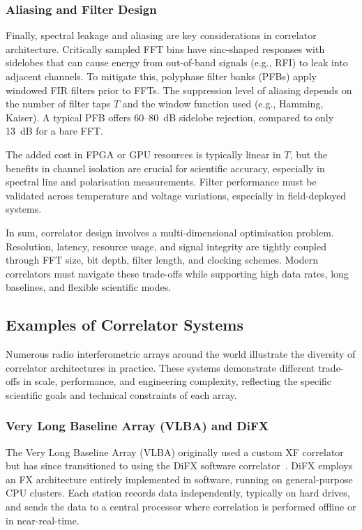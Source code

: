         \subsubsection{Aliasing and Filter Design}
        Finally, spectral leakage and aliasing are key considerations in correlator architecture. Critically sampled FFT bins have sinc-shaped responses with sidelobes that can cause energy from out-of-band signals (e.g., RFI) to leak into adjacent channels. To mitigate this, polyphase filter banks (PFBs) apply windowed FIR filters prior to FFTs. The suppression level of aliasing depends on the number of filter taps \( T \) and the window function used (e.g., Hamming, Kaiser). A typical PFB offers 60--80~dB sidelobe rejection, compared to only 13~dB for a bare FFT.

        The added cost in FPGA or GPU resources is typically linear in \( T \), but the benefits in channel isolation are crucial for scientific accuracy, especially in spectral line and polarisation measurements. Filter performance must be validated across temperature and voltage variations, especially in field-deployed systems.

    \bigskip

    In sum, correlator design involves a multi-dimensional optimisation problem. Resolution, latency, resource usage, and signal integrity are tightly coupled through FFT size, bit depth, filter length, and clocking schemes. Modern correlators must navigate these trade-offs while supporting high data rates, long baselines, and flexible scientific modes.

    \subsection{Examples of Correlator Systems}
    Numerous radio interferometric arrays around the world illustrate the diversity of correlator architectures in practice. These systems demonstrate different trade-offs in scale, performance, and engineering complexity, reflecting the specific scientific goals and technical constraints of each array.

        \subsubsection{Very Long Baseline Array (VLBA) and DiFX}
        The Very Long Baseline Array (VLBA) originally used a custom XF correlator but has since transitioned to using the DiFX software correlator~\cite{Deller2011}. DiFX employs an FX architecture entirely implemented in software, running on general-purpose CPU clusters. Each station records data independently, typically on hard drives, and sends the data to a central processor where correlation is performed offline or in near-real-time.

